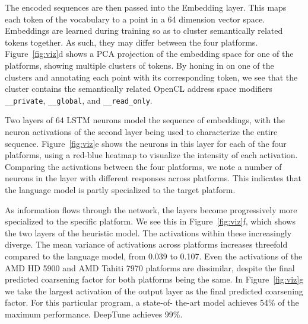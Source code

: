 The encoded sequences are then passed into the Embedding layer. This maps each
token of the vocabulary to a point in a 64 dimension vector space. Embeddings
are learned during training so as to cluster semantically related tokens
together. As such, they may differ between the four platforms.
Figure~\ref{fig:viz}d shows a PCA projection of the embedding space for one of
the platforms, showing multiple clusters of tokens. By honing in on one of the
clusters and annotating each point with its corresponding token, we see that the
cluster contains the semantically related OpenCL address space modifiers
\texttt{\_\_private}, \texttt{\_\_global}, and \texttt{\_\_read\_only}.

Two layers of 64 LSTM neurons model the sequence of embeddings, with the neuron
activations of the second layer being used to characterize the entire sequence.
Figure~\ref{fig:viz}e shows the neurons in this layer for each of the four
platforms, using a red-blue heatmap to visualize the intensity of each
activation. Comparing the activations between the four platforms, we note a
number of neurons in the layer with different responses across platforms. This
indicates that the language model is partly specialized to the target platform.

As information flows through the network, the layers become progressively more
specialized to the specific platform. We see this in Figure~\ref{fig:viz}f,
which shows the two layers of the heuristic model. The activations within these
increasingly diverge. The mean variance of activations across platforms
increases threefold compared to the language model, from 0.039 to 0.107. Even
the activations of the AMD HD 5900 and AMD Tahiti 7970 platforms are dissimilar,
despite the final predicted coarsening factor for both platforms being the same.
In Figure~\ref{fig:viz}g we take the largest activation of the output layer as
the final predicted coarsening factor. For this particular program, a state-of-
the-art model achieves 54\% of the maximum performance. DeepTune achieves 99\%.
